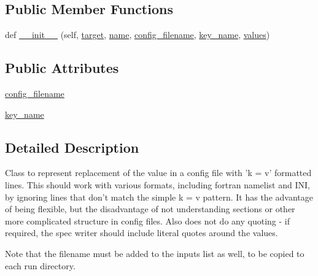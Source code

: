 \subsection*{Public Member Functions}
\begin{DoxyCompactItemize}
\item 
def \hyperlink{classcodar_1_1cheetah_1_1parameters_1_1_param_key_value_acbd81ea2c61adc66c1e5e9f150d9cc39}{\+\_\+\+\_\+init\+\_\+\+\_\+} (self, \hyperlink{classcodar_1_1cheetah_1_1parameters_1_1_param_a5603d43a20cfc6447c3718406ce0669e}{target}, \hyperlink{classcodar_1_1cheetah_1_1parameters_1_1_param_ac9982d62cd18a368a3fbc26541e14209}{name}, \hyperlink{classcodar_1_1cheetah_1_1parameters_1_1_param_key_value_ac463b82e60e626e89e37d267803294ac}{config\+\_\+filename}, \hyperlink{classcodar_1_1cheetah_1_1parameters_1_1_param_key_value_aed81003e4524c70ca0329433fa677f6c}{key\+\_\+name}, \hyperlink{classcodar_1_1cheetah_1_1parameters_1_1_param_aefcc82658f511bddd6605e6ac6e74fbf}{values})
\end{DoxyCompactItemize}
\subsection*{Public Attributes}
\begin{DoxyCompactItemize}
\item 
\hyperlink{classcodar_1_1cheetah_1_1parameters_1_1_param_key_value_ac463b82e60e626e89e37d267803294ac}{config\+\_\+filename}
\item 
\hyperlink{classcodar_1_1cheetah_1_1parameters_1_1_param_key_value_aed81003e4524c70ca0329433fa677f6c}{key\+\_\+name}
\end{DoxyCompactItemize}


\subsection{Detailed Description}
\begin{DoxyVerb}Class to represent replacement of the value in a config file with
'k = v' formatted lines. This should work with various formats, including
fortran namelist and INI, by ignoring lines that don't match the
simple k = v pattern. It has the advantage of being flexible, but the
disadvantage of not understanding sections or other more complicated
structure in config files. Also does not do any quoting - if required,
the spec writer should include literal quotes around the values.

Note that the filename must be added to the inputs list as well, to be
copied to each run directory.
\end{DoxyVerb}
 

